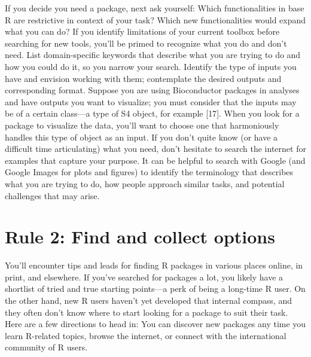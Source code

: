 \documentclass[10pt,letterpaper]{article}
\begin{document}
If you decide you need a package, next ask yourself: Which
functionalities in base R are restrictive in context of your task? Which
new functionalities would expand what you can do? If you identify
limitations of your current toolbox before searching for new tools,
you'll be primed to recognize what you do and don't need. List
domain-specific keywords that describe what you are trying to do and how
you could do it, so you narrow your search. Identify the type of inputs
you have and envision working with them; contemplate the desired outputs
and corresponding format. Suppose you are using Bioconductor packages in
analyses and have outputs you want to visualize; you must consider that
the inputs may be of a certain class---a type of S4 object, for example
{[}17{]}. When you look for a package to visualize the data, you'll want
to choose one that harmoniously handles this type of object as an input.
If you don't quite know (or have a difficult time articulating) what you
need, don't hesitate to search the internet for examples that capture
your purpose. It can be helpful to search with Google (and Google Images
for plots and figures) to identify the terminology that describes what
you are trying to do, how people approach similar tasks, and potential
challenges that may arise.

\hypertarget{rule-2-find-and-collect-options}{%
\section{Rule 2: Find and collect
options}\label{rule-2-find-and-collect-options}}

You'll encounter tips and leads for finding R packages in various places
online, in print, and elsewhere. If you've searched for packages a lot,
you likely have a shortlist of tried and true starting points---a perk
of being a long-time R user. On the other hand, new R users haven't yet
developed that internal compass, and they often don't know where to
start looking for a package to suit their task. Here are a few
directions to head in: You can discover new packages any time you learn
R-related topics, browse the internet, or connect with the international
community of R users.
\end{document}
